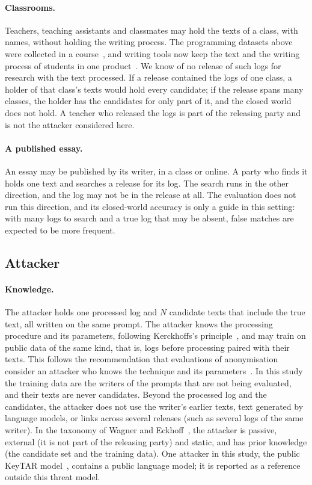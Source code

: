 \paragraph{Classrooms.}
Teachers, teaching assistants and classmates may hold the texts of a class, with names, without holding the
writing process. The programming datasets above were collected in a course~\cite{edwards2023csedm}, and writing tools
now keep the text and the writing process of students in one product~\cite{grammarly2026authorship,turnitin2026clarity}.
We know of no release of such logs for research with the text processed. If a release contained the logs of one class,
a holder of that class's texts would hold every candidate; if the release spans many classes, the holder has the
candidates for only part of it, and the closed world does not hold. A teacher who released the logs is part of the
releasing party and is not the attacker considered here.

\paragraph{A published essay.}
An essay may be published by its writer, in a class or online. A party who finds it holds one text and searches a
release for its log. The search runs in the other direction, and the log may not be in the release at all. The
evaluation does not run this direction, and its closed-world accuracy is only a guide in this setting: with many logs
to search and a true log that may be absent, false matches are expected to be more frequent.

\subsection{Attacker}
\label{sec:threat-model:attacker}

\paragraph{Knowledge.}
The attacker holds one processed log and $N$ candidate texts that include the true text, all written on the same
prompt. The attacker knows the processing procedure and its parameters, following Kerckhoffs's
principle~\cite{kerckhoffs1883}, and may train on public data of the same kind, that is, logs before processing paired
with their texts. This follows the recommendation that evaluations of anonymisation consider an attacker who knows the
technique and its parameters~\cite{hanisch2021survey}. In this study the training data are the writers of the prompts
that are not being evaluated, and their texts are never candidates. Beyond the processed log and the candidates, the
attacker does not use the writer's earlier texts, text generated by language models, or links across several releases
(such as several logs of the same writer). In the taxonomy of Wagner and Eckhoff~\cite{wagner2018metrics}, the
attacker is passive, external (it is not part of the releasing party) and static, and has prior knowledge (the
candidate set and the training data). One attacker in this study, the public KeyTAR model~\cite{qiu2026keytar},
contains a public language model; it is reported as a reference outside this threat model.

